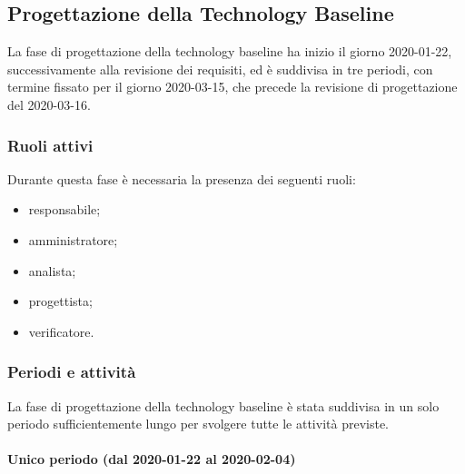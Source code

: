 		\subsection{Progettazione della Technology Baseline}
	
			La fase di progettazione della technology baseline ha inizio il giorno 2020-01-22, successivamente alla revisione dei requisiti, ed è suddivisa in tre periodi, con termine fissato per il giorno 2020-03-15, che precede la revisione di progettazione del 2020-03-16.
			
			\subsubsection{Ruoli attivi}
			
				Durante questa fase è necessaria la presenza dei seguenti ruoli:
				\begin{itemize}
					\item responsabile;
					\item amministratore;
					\item analista;
					\item progettista;
					\item verificatore.
				\end{itemize}
			
			\subsubsection{Periodi e attività}
			
				La fase di progettazione della technology baseline è stata suddivisa in un solo periodo sufficientemente lungo per svolgere tutte le attività previste.
				
				\paragraph{Unico periodo (dal 2020-01-22 al 2020-02-04)}
				
